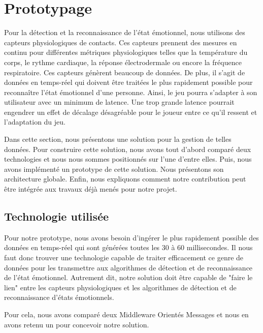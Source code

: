 \documentclass[11pt]{article}
\begin{document}
\section{Prototypage}\label{sec:prototypage}
	Pour la détection et la reconnaissance de l'état émotionnel, nous utilisons des capteurs physiologiques de contacts.
	Ces capteurs prennent des mesures en continu pour différentes métriques physiologiques telles que la température du corps, le rythme cardiaque, la réponse électrodermale ou encore la fréquence respiratoire.
	Ces capteurs génèrent beaucoup de données.
	De plus, il s'agit de données en temps-réel qui doivent être traitées le plus rapidement possible pour reconnaître l'état émotionnel d'une personne. 
	Ainsi, le jeu pourra s'adapter à son utilisateur avec un minimum de latence. 
	Une trop grande latence pourrait engendrer un effet de décalage désagréable pour le joueur entre ce qu'il ressent et l'adaptation du jeu.\par
	Dans cette section, nous présentons une solution pour la gestion de telles données. Pour construire cette solution, nous avons tout d'abord comparé deux technologies et nous nous sommes positionnés sur l'une d'entre elles.
	Puis, nous avons implémenté un prototype de cette solution.
	Nous présentons son architecture globale.
	Enfin, nous expliquons comment notre contribution peut être intégrée aux travaux déjà menés pour notre projet.
	\subsection{Technologie utilisée}\label{sec:prototech}
		Pour notre prototype, nous avons besoin d'ingérer le plus rapidement possible des données en temps-réel qui sont générées toutes les 30 à 60 millisecondes.
		Il nous faut donc trouver une technologie capable de traiter efficacement ce genre de données pour les transmettre aux algorithmes de détection et de reconnaissance de l'état émotionnel.
		Autrement dit, notre solution doit être capable de "faire le lien" entre les capteurs physiologiques et les algorithmes de détection et de reconnaissance d'états émotionnels.\par
		Pour cela, nous avons comparé deux Middleware Orientés Messages et nous en avons retenu un pour concevoir notre solution.
\end{document}
